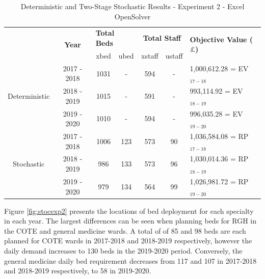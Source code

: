 \documentclass[../thesis.tex]{subfiles}
\begin{document}
\begin{table}[h!]
    \centering
    \begin{tabular}{ccccccl}\toprule
 & \multirow{2}{*}{\textbf{Year}}& \multicolumn{2}{l}{\textbf{Total Beds}} & \multicolumn{2}{c}{\textbf{Total Staff}} & \multirow{2}{*}{\textbf{Objective Value ($\pounds$)}}\\ \cmidrule(lr){3-4} \cmidrule(lr){5-6}
&& xbed           & ubed          & xstaff         & ustaff         \\ \midrule
     \multirow{3}{*}{Deterministic} & 2017 - 2018 & 1031 & - &  594 & - & 1,000,612.28 =  EV$_{17-18}$ \\ 
      & 2018 - 2019 & 1015 & - & 591 & - & 993,114.92 =  EV$_{18-19}$ \\
      & 2019 - 2020 & 1010 & - & 594 & - & 996,035.28 =  EV$_{19-20}$\\ \midrule
     \multirow{3}{*}{Stochastic} & 2017 - 2018 & 1006 & 123 & 573 & 90 & 1,036,584.08 =  RP$_{17-18}$ \\ 
      & 2018 - 2019 & 986 & 133 & 573 & 96 & 1,030,014.36 =  RP$_{18-19}$ \\
      & 2019 - 2020 & 979 & 134 & 564 & 99 & 1,026,981.72 =  RP$_{19-20}$\\ \bottomrule      
    \end{tabular}
    \caption{Deterministic and Two-Stage Stochastic Results - Experiment 2 - Excel OpenSolver}
    \label{tab:detstocresults2}
\end{table}

Figure \ref{fig:stocexp2} presents the locations of bed deployment for each specialty in each year. The largest differences can be seen when planning beds for RGH in the COTE and general medicine wards. A total of of 85 and 98 beds are each planned for COTE wards in 2017-2018 and 2018-2019 respectively, however the daily demand increases to 130 beds in the 2019-2020 period. Conversely, the general medicine daily bed requirement decreases from 117 and 107 in 2017-2018 and 2018-2019 respectively, to 58 in 2019-2020.
\end{document}

